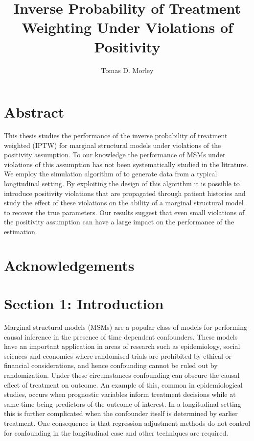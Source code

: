 \documentclass[11pt]{article}
\title{Inverse Probability of Treatment Weighting Under Violations of Positivity}
\author{Tomas D. Morley}
\begin{document}
    
    
    \maketitle
    
    

    
    \newpage

\section{Abstract}\label{abstract}

This thesis studies the performance of the inverse probability of
treatment weighted (IPTW) for marginal structural models under
violations of the positivity assumption. To our knowledge the
performance of MSMs under violations of this assumption has not been
systematically studied in the litrature. We employ the simulation
algorithm of \citet{Havercroft2012} to generate data from a typical
longitudinal setting. By exploiting the design of this algorithm it is
possible to introduce positivity violations that are propagated through
patient histories and study the effect of these violations on the
ability of a marginal structural model to recover the true parameters.
Our results suggest that even small violations of the positivity
assumption can have a large impact on the performance of the estimation.

    \newpage

\section{Acknowledgements}\label{acknowledgements}

    \newpage

\tableofcontents{}

    \newpage

\section{Section 1: Introduction}\label{section-1-introduction}

Marginal structural models (MSMs) are a popular class of models for
performing causal inference in the presence of time dependent
confounders. These models have an important application in areas of
research such as epidemiology, social sciences and economics where
randomised trials are prohibited by ethical or financial considerations,
and hence confounding cannot be ruled out by randomization. Under these
circumstances confounding can obscure the causal effect of treatment on
outcome. An example of this, common in epidemiological studies, occurs
when prognostic variables inform treatment decisions while at same time
being predictors of the outcome of interest. In a longitudinal setting
this is further complicated when the confounder itself is determined by
earlier treatment. One consequence is that regression adjustment methods
do not control for confounding in the longitudinal case and other
techniques are required.
\end{document}
